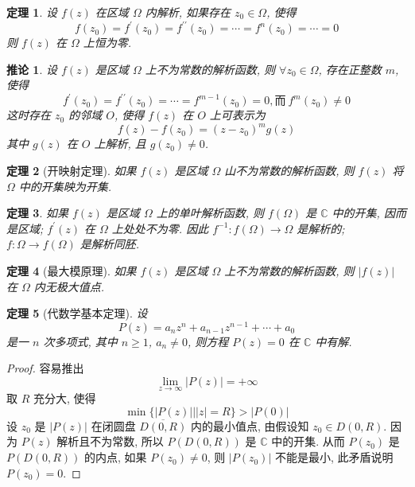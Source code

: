 \documentclass[12pt,a4paper]{article}
\newtheorem{thm}{定理}[section]  %
\newtheorem{corollary}{推论}[section] %
\begin{document}
\begin{thm}
    设 $f(z)$ 在区域 $\Omega$ 内解析, 如果存在 $z_0 \in \Omega$, 使得
    \[f(z_0) = f^{\prime}(z_0) = f^{\prime \prime} (z_0) = \cdots = f^{n}(z_0) = \cdots = 0\]
    则 $f(z)$ 在 $\Omega$ 上恒为零.
\end{thm}

\begin{corollary}
    设 $f(z)$ 是区域 $\Omega$ 上不为常数的解析函数, 则 $\forall z_0 \in \Omega$, 存在正整数 $m$, 使得
    \[f^{\prime}(z_0) = f^{\prime \prime}(z_0) = \cdots = f^{m-1}(z_0) = 0, \text{而}\  f^{m}(z_0) \neq 0\]
    这时存在 $z_0$ 的邻域 $O$, 使得 $f(z)$ 在 $O$ 上可表示为
    \[f(z) - f(z_0) = (z - z_0)^{m} g(z)\] 其中 $g(z)$ 在 $O$ 上解析, 且 $g(z_0) \neq 0$.
\end{corollary}

\begin{thm}[开映射定理]
    如果 $f(z)$ 是区域 $\Omega$ 山不为常数的解析函数, 则 $f(z)$ 将 $\Omega$ 中的开集映为开集.
\end{thm}

\begin{thm}
    如果 $f(z)$ 是区域 $\Omega$ 上的单叶解析函数, 则 $f(\Omega)$ 是 $\mathbb{C}$ 中的开集, 因而是区域;
    $f^{\prime}(z)$ 在 $\Omega$ 上处处不为零. 因此 $f^{-1}: f(\Omega) \to \Omega$ 是解析的; $f: \Omega \to f(\Omega)$ 是解析同胚.
\end{thm}

\begin{thm}[最大模原理]
    如果 $f(z)$ 是区域 $\Omega$ 上不为常数的解析函数, 则 $|f(z)|$ 在 $\Omega$ 内无极大值点.
\end{thm}

\begin{thm}[代数学基本定理]
    设 \[P(z) = a_n z^n + a_{n-1} z^{n-1} + \cdots + a_0\]
    是一 $n$ 次多项式, 其中 $n \geq 1$, $a_n \neq 0$, 则方程 $P(z) = 0$ 在 $\mathbb{C}$ 中有解.
\end{thm}

\begin{proof}
    容易推出 \[ \lim_{z \to \infty} |P(z)| = + \infty\]
    取 $R$ 充分大, 使得 \[ \min\{|P(z)| | |z| = R\} > |P(0)| \]
    设 $z_0$ 是 $|P(z)|$ 在闭圆盘 $\overline{D(0,R)}$ 内的最小值点, 由假设知 $z_0 \in D(0,R)$. 因为 $P(z)$ 解析且不为常数, 所以 $P(D(0,R))$ 是 $\mathbb{C}$ 中的开集. 
    从而 $P(z_0)$ 是 $P(D(0,R))$ 的内点, 如果 $P(z_0) \neq 0$, 则 $|P(z_0)|$ 不能是最小, 此矛盾说明 $P(z_0) = 0$.

\end{proof}
\end{document}
